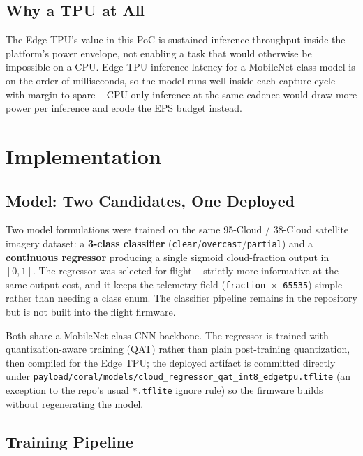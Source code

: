 \subsection{Why a TPU at All}

The Edge TPU's value in this PoC is sustained inference throughput inside
the platform's power envelope, not enabling a task that would otherwise be
impossible on a CPU. Edge TPU inference latency for a MobileNet-class model
is on the order of milliseconds, so the model runs well inside each capture
cycle with margin to spare -- CPU-only inference at the same cadence would
draw more power per inference and erode the EPS budget instead.

\section{Implementation}

\subsection{Model: Two Candidates, One Deployed}

Two model formulations were trained on the same 95-Cloud / 38-Cloud
satellite imagery dataset: a \textbf{3-class classifier}
(\texttt{clear}/\texttt{overcast}/\texttt{partial}) and a
\textbf{continuous regressor} producing a single sigmoid cloud-fraction
output in $[0,1]$. The regressor was selected for flight -- strictly more
informative at the same output cost, and it keeps the telemetry field
(\texttt{fraction $\times$ 65535}) simple rather than needing a class enum.
The classifier pipeline remains in the repository but is not built into the
flight firmware.

Both share a MobileNet-class CNN backbone. The regressor is trained with
quantization-aware training (QAT) rather than plain post-training
quantization, then compiled for the Edge TPU; the deployed artifact is
committed directly under
\href{\repourl/blob/main/payload/coral/models/cloud_regressor_qat_int8_edgetpu.tflite}{\texttt{payload/coral/models/cloud\_regressor\_qat\_int8\_edgetpu.tflite}}
(an exception to the repo's usual \texttt{*.tflite} ignore rule) so the
firmware builds without regenerating the model.

\subsection{Training Pipeline}

